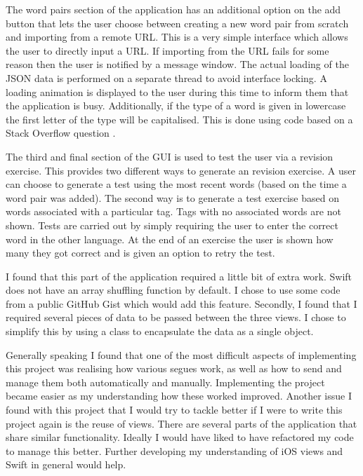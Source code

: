 \documentclass[paper=a4, fontsize=11pt]{scrartcl}	%
\numberwithin{equation}{section}															%
\numberwithin{figure}{section}																%
\numberwithin{table}{section}
\begin{document}
The word pairs section of the application has an additional option on the add button that lets the user choose between creating a new word pair from scratch and importing from a remote URL. This is a very simple interface which allows the user to directly input a URL. If importing from the URL fails for some reason then the user is notified by a message window. The actual loading of the JSON data is performed on a separate thread to avoid interface locking. A loading animation is displayed to the user during this time to inform them that the application is busy. Additionally, if the type of a word is given in lowercase the first letter of the type will be capitalised. This is done using code based on a Stack Overflow question \cite{stringhelper-stackoverflow}.

The third and final section of the GUI is used to test the user via a revision exercise. This provides two different ways to generate an revision exercise. A user can choose to generate a test using the most recent words (based on the time a word pair was added). The second way is to generate a test exercise based on words associated with a particular tag. Tags with no associated words are not shown. Tests are carried out by simply requiring the user to enter the correct word in the other language. At the end of an exercise the user is shown how many they got correct and is given an option to retry the test. 

I found that this part of the application required a little bit of extra work. Swift does not have an array shuffling function by default. I chose to use some code from a public GitHub Gist \cite{arrayshuffle-gist} which would add this feature. Secondly, I found that I required several pieces of data to be passed between the three views. I chose to simplify this by using a class to encapsulate the data as a single object.

Generally speaking I found that one of the most difficult aspects of implementing this project was realising how various segues work, as well as how to send and manage them both automatically and manually. Implementing the project became easier as my understanding how these worked improved. Another issue I found with this project that I would try to tackle better if I were to write this project again is the reuse of views. There are several parts of the application that share similar functionality. Ideally I would have liked to have refactored my code to manage this better. Further developing my understanding of iOS views and Swift in general would help.
\end{document}
